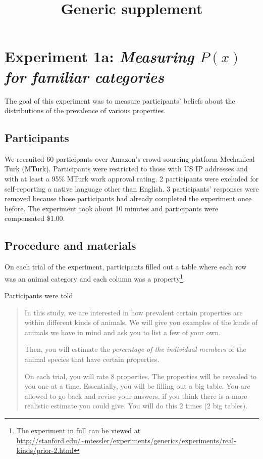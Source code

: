 \documentclass[10pt,letterpaper]{article}
\title{Generic supplement}
\begin{document}
\maketitle



\appendix


\section{Experiment 1a: \emph{Measuring $P(x)$ for familiar categories}}

The goal of this experiment was to measure participants' beliefs about the distributions of the prevalence of various properties.

\subsection{Participants}

We recruited 60 participants over Amazon's crowd-sourcing platform Mechanical Turk (MTurk).  Participants were restricted to those with US IP addresses and with at least a 95\% MTurk work approval rating. 
2 participants were excluded for self-reporting a native language other than English. 
3 participants' responses were removed because those participants had already completed the experiment once before.
The experiment took about 10 minutes and participants were compensated \$1.00.

\subsection{Procedure and materials}

On each trial of the experiment, participants filled out a table where each row was an animal category and each column was a property\footnote{The experiment in full can be viewed at \url{http://stanford.edu/~mtessler/experiments/generics/experiments/real-kinds/prior-2.html}}.

Participants were told 
\begin{quote}
In this study, we are interested in how prevalent certain properties are within different kinds of animals. We will give you examples of the kinds of animals we have in mind and ask you to list a few of your own.

Then, you will estimate the \emph{percentage of the individual members} of the animal species that have certain properties.

On each trial, you will rate 8 properties. The properties will be revealed to you one at a time. Essentially, you will be filling out a big table. You are allowed to go back and revise your answers, if you think there is a more realistic estimate you could give. You will do this 2 times (2 big tables). 

\end{quote}
\end{document}
